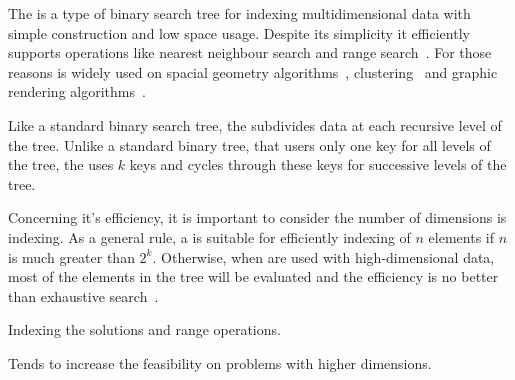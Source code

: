 The \kdtree{} is a type of binary search tree for indexing multidimensional
data with simple construction and low space usage.
Despite its simplicity it efficiently supports operations like nearest
neighbour search and range search~\cite{bentley1975}.
For those reasons \kdtree{} is widely used on
spacial geometry algorithms~\cite{preparata2012computational, guttman1984r}, 
clustering~\cite{kanungo2002efficient, indyk1998approximate}
and graphic rendering algorithms~\cite{owens2007survey}.

Like a standard binary search tree, the \kdtree{} subdivides data at each
recursive level of the tree.
Unlike a standard binary tree, that users only one key for all levels of the tree,
the \kdtree{} uses $k$ keys and cycles through these keys for successive levels
of the tree.


Concerning it's efficiency, it is important to consider the number of dimensions
\kdtree{} is indexing.
As a general rule, a \kdtree{} is suitable for efficiently indexing of $n$ elements
if $n$ is much greater than $2^k$.
Otherwise, when \kdtree{} are used with high-dimensional data, most of the elements
in the tree will be evaluated and the efficiency is no better than exhaustive search~\cite{toth2004handbook}.

Indexing the solutions and range operations.

Tends to increase the feasibility on problems with higher dimensions.

